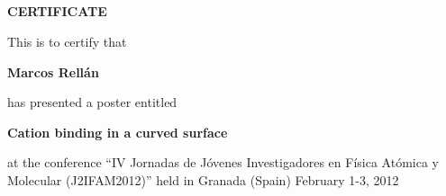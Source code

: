 \documentclass [13pt,a4paper] {letter}
\begin{document}
\pagestyle{empty} 
\begin{verbatim}





\end{verbatim}
\pagestyle{empty}
\begin{center}
{\bf {\Huge CERTIFICATE}}

\vspace {1.5cm}
This is to certify that
\vspace {1cm}

{\bf \Large  Marcos    Rellán }
\vspace {1cm}

has presented a poster entitled
\vspace {1cm}

{\bf \large  Cation binding in a curved surface  }
\vspace {1cm}

at the conference { \textquotedblleft IV Jornadas de Jóvenes Investigadores en Física Atómica y Molecular (J2IFAM2012)\textquotedblright} 
held in Granada (Spain) February 1-3, 2012
\end{center}
\vspace {3cm}
\end{document}
